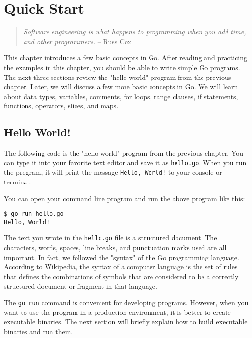 \cleardoublepage
{}
\chapter{Quick Start}

\begin{quote}
\textit{Software engineering is what happens to programming when you add time,
and other programmers.} -- Russ Cox
\end{quote}

This chapter introduces a few basic concepts in Go. After reading and practicing
the examples in this chapter, you should be able to write simple Go programs.
The next three sections review the "hello world" program from the previous
chapter. Later, we will discuss a few more basic concepts in Go. We will learn
about data types, variables, comments, for loops, range clauses, if statements,
functions, operators, slices, and maps.

\section{Hello World!}

The following code is the "hello world" program from the previous chapter. You
can type it into your favorite text editor and save it as \texttt{hello.go}.
When you run the program, it will print the message \texttt{Hello, World!} to
your console or terminal.



You can open your command line program and run the above program like
this:

\begin{lstlisting}[numbers=none]
$ go run hello.go
Hello, World!
\end{lstlisting}

The text you wrote in the \texttt{hello.go} file is a structured document. The
characters, words, spaces, line breaks, and punctuation marks used are all
important. In fact, we followed the "syntax" of the Go programming language.
According to Wikipedia, the syntax of a computer language is the set of rules
that defines the combinations of symbols that are considered to be a correctly
structured document or fragment in that language.

The \texttt{go run} command is convenient for developing programs. However, when
you want to use the program in a production environment, it is better to create
executable binaries. The next section will briefly explain how to build
executable binaries and run them.

